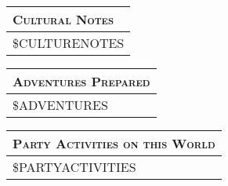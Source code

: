 \documentclass[12pt,letterpaper,twocolumn]{article}
\begin{document}
\begin{tabularx}{\linewidth}{| X |}
    \multicolumn{1}{l}{\textsc{Cultural Notes}} \\
    \hline
    \$CULTURENOTES \\
    \hline
\end{tabularx}

\begin{tabularx}{\linewidth}{| X |}
    \multicolumn{1}{l}{\textsc{Adventures Prepared}} \\
    \hline
    \$ADVENTURES \\
    \hline
\end{tabularx}

\begin{tabularx}{\linewidth}{| X |}
    \multicolumn{1}{l}{\textsc{Party Activities on this World}} \\
    \hline
    \$PARTYACTIVITIES \\
    \hline
\end{tabularx}
\end{document}
